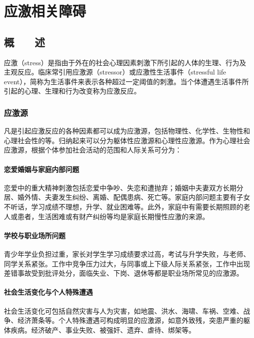 \chapter{应激相关障碍}

\section{概　　述}

应激（stress）是指由于外在的社会心理因素刺激下所引起的人体的生理、行为及主观反应。临床常引用应激源（stressor）或应激性生活事件（stressful
life
event），简称为生活事件来表示各种超过一定阈值的刺激。当个体遭遇生活事件所引起的心理、生理和行为改变称为应激反应。

\subsection{应激源}

凡是引起应激反应的各种因素都可以成为应激源，包括物理性、化学性、生物性和心理社会性的等。归纳起来可以分为躯体性应激源和心理性应激源。作为心理社会应激源，根据个体参加社会活动的范围和人际关系可分为：

\subsubsection{恋爱婚姻与家庭内部问题}

恋爱中的重大精神刺激包括恋爱中争吵、失恋和遭抛弃；婚姻中夫妻双方长期分居、婚外情、夫妻发生纠纷、离婚、配偶患病、死亡等。家庭内部问题主要有子女不听话，学习成绩不理想，升学、就业困难等。此外，家庭中有需要长期照顾的老人或患者，生活困难或有财产纠纷等均是家庭长期慢性应激的来源。

\subsubsection{学校与职业场所问题}

青少年学业负担过重，家长对学生学习成绩要求过高，考试与升学失败，与老师、同学关系紧张。工作中竞争压力过大，与同事或上下级人际关系紧张，工作中出现差错事故受到批评处分，面临失业、下岗、退休等都是职业场所常见的应激源。

\subsubsection{社会生活变化与个人特殊遭遇}

社会生活变化可包括自然灾害与人为灾害，如地震、洪水、海啸、车祸、空难、战争、经济萧条等。个人特殊遭遇可构成明显的应激源，如意外致残，突患严重的躯体疾病。经济破产、事业失败、被强奸、遗弃、虐待、绑架等。

